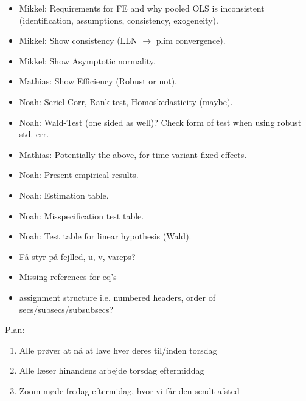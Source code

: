 \begin{itemize}
    \item Mikkel: Requirements for FE and why pooled OLS is inconsistent (identification, assumptions, consistency, exogeneity). 
    \item Mikkel: Show consistency (LLN $\to$ plim convergence). 
    \item Mikkel: Show Asymptotic normality.
    \item Mathias: Show Efficiency (Robust or not).
    \item Noah: Seriel Corr, Rank test, Homoskedasticity (maybe). 
    \item Noah: Wald-Test (one sided as well)? Check form of test when using robust std. err. 
    \item Mathias: Potentially the above, for time variant fixed effects.
    \item Noah: Present empirical results. 
    \item Noah: Estimation table. 
    \item Noah: Misspecification test table.
    \item Noah: Test table for linear hypothesis (Wald). 
    \item Få styr på fejlled, u, v, vareps?
    \item Missing references for eq's 
    \item assignment structure i.e. numbered headers, order of secs/subsecs/subsubsecs?
\end{itemize}

Plan:
\begin{enumerate}
    \item Alle prøver at nå at lave hver deres til/inden torsdag
    \item Alle læser hinandens arbejde torsdag eftermiddag
    \item Zoom møde fredag eftermidag, hvor vi får den sendt afsted
\end{enumerate}